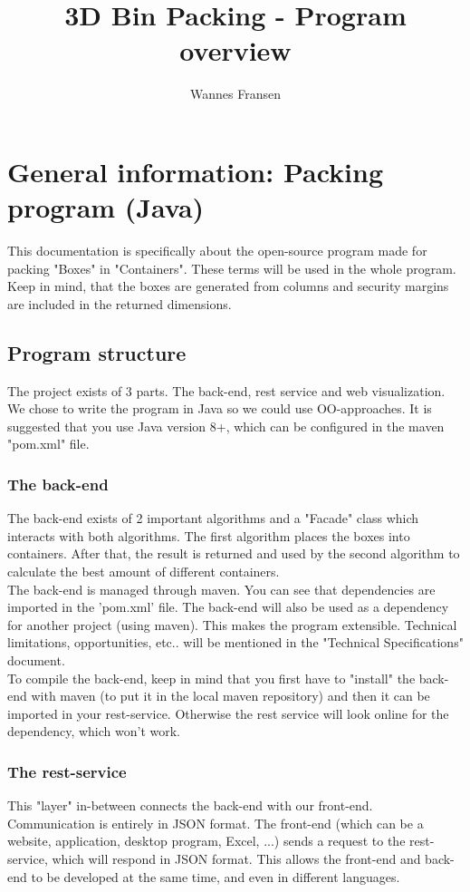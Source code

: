 \documentclass[a4paper,12pt]{article}
\begin{document}
\author{Wannes Fransen}
\title{3D Bin Packing - Program overview}

\section{General information: Packing program (Java)}
This documentation is specifically about the open-source program made for packing "Boxes" in "Containers". These terms will be used in the whole program. Keep in mind, that the boxes are generated from columns and security margins are included in the returned dimensions. 

\subsection{Program structure}

The project exists of 3 parts. The back-end, rest service and web visualization.
We chose to write the program in Java so we could use OO-approaches. It is suggested that you use Java version 8+, which can be configured in the maven "pom.xml" file.

\subsubsection{The back-end}
The back-end exists of 2 important algorithms and a "Facade" class which interacts with both algorithms. The first algorithm places the boxes into containers. After that, the result is returned and used by the second algorithm to calculate the best amount of different containers.\\

The back-end is managed through maven. You can see that dependencies are imported in the 'pom.xml' file. The back-end will also be used as a dependency for another project (using maven). This makes the program extensible. Technical limitations, opportunities, etc.. will be mentioned in the "Technical Specifications" document.\\

To compile the back-end, keep in mind that you first have to "install" the back-end with maven (to put it in the local maven repository) and then it can be imported in your rest-service. Otherwise the rest service will look online for the dependency, which won't work.

\subsubsection{The rest-service}
This "layer" in-between connects the back-end with our front-end. Communication is entirely in JSON format. The front-end (which can be a website, application, desktop program, Excel, ...) sends a request to the rest-service, which will respond in JSON format. This allows the front-end and back-end to be developed at the same time, and even in different languages. \\
\end{document}
